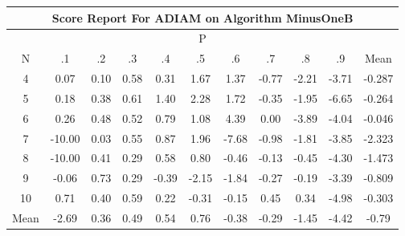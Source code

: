 \documentclass[11pt,a4paper]{report}
\begin{document}
\begin{longtable}{ | c || c | c | c | c | c | c | c | c | c || c |}
\hline
\multicolumn{11}{|c|}{ Score Report For ADIAM on Algorithm MinusOneB} \\
\hline
\multicolumn{11}{|c|}{ P } \\
\hline
N & .1 & .2 & .3 & .4 & .5 & .6 & .7 & .8 & .9 & Mean\\
 \hline
 \hline
 \endhead
  4 &  \cellcolor[HTML]{FFFFFF} 0.07 &  \cellcolor[HTML]{FFFFFF} 0.10 &  \cellcolor[HTML]{EFEFFF} 0.58 &  \cellcolor[HTML]{F7F7FF} 0.31 &  \cellcolor[HTML]{D7D7FF} 1.67 &  \cellcolor[HTML]{DFDFFF} 1.37 &  \cellcolor[HTML]{FFEFEF} -0.77 &  \cellcolor[HTML]{FFC7C7} -2.21 &  \cellcolor[HTML]{FF9F9F} -3.71 & -0.287 \\
  5 &  \cellcolor[HTML]{F7F7FF} 0.18 &  \cellcolor[HTML]{F7F7FF} 0.38 &  \cellcolor[HTML]{EFEFFF} 0.61 &  \cellcolor[HTML]{DFDFFF} 1.40 &  \cellcolor[HTML]{C7C7FF} 2.28 &  \cellcolor[HTML]{D7D7FF} 1.72 &  \cellcolor[HTML]{FFF7F7} -0.35 &  \cellcolor[HTML]{FFCFCF} -1.95 &  \cellcolor[HTML]{FF5858} -6.65 & -0.264 \\
  6 &  \cellcolor[HTML]{F7F7FF} 0.26 &  \cellcolor[HTML]{EFEFFF} 0.48 &  \cellcolor[HTML]{EFEFFF} 0.52 &  \cellcolor[HTML]{EFEFFF} 0.79 &  \cellcolor[HTML]{E7E7FF} 1.08 &  \cellcolor[HTML]{8F8FFF} 4.39 &  \cellcolor[HTML]{FFFFFF} 0.00 &  \cellcolor[HTML]{FF9F9F} -3.89 &  \cellcolor[HTML]{FF9797} -4.04 & -0.046 \\
  7 &  \cellcolor[HTML]{FF0000} -10.00 &  \cellcolor[HTML]{FFFFFF} 0.03 &  \cellcolor[HTML]{EFEFFF} 0.55 &  \cellcolor[HTML]{E7E7FF} 0.87 &  \cellcolor[HTML]{CFCFFF} 1.96 &  \cellcolor[HTML]{FF4040} -7.68 &  \cellcolor[HTML]{FFE7E7} -0.98 &  \cellcolor[HTML]{FFCFCF} -1.81 &  \cellcolor[HTML]{FF9F9F} -3.85 & -2.323 \\
  8 &  \cellcolor[HTML]{FF0000} -10.00 &  \cellcolor[HTML]{F7F7FF} 0.41 &  \cellcolor[HTML]{F7F7FF} 0.29 &  \cellcolor[HTML]{EFEFFF} 0.58 &  \cellcolor[HTML]{E7E7FF} 0.80 &  \cellcolor[HTML]{FFF7F7} -0.46 &  \cellcolor[HTML]{FFFFFF} -0.13 &  \cellcolor[HTML]{FFF7F7} -0.45 &  \cellcolor[HTML]{FF8F8F} -4.30 & -1.473 \\
  9 &  \cellcolor[HTML]{FFFFFF} -0.06 &  \cellcolor[HTML]{EFEFFF} 0.73 &  \cellcolor[HTML]{F7F7FF} 0.29 &  \cellcolor[HTML]{FFF7F7} -0.39 &  \cellcolor[HTML]{FFC7C7} -2.15 &  \cellcolor[HTML]{FFCFCF} -1.84 &  \cellcolor[HTML]{FFF7F7} -0.27 &  \cellcolor[HTML]{FFF7F7} -0.19 &  \cellcolor[HTML]{FFA7A7} -3.39 & -0.809 \\
  10 &  \cellcolor[HTML]{EFEFFF} 0.71 &  \cellcolor[HTML]{F7F7FF} 0.40 &  \cellcolor[HTML]{EFEFFF} 0.59 &  \cellcolor[HTML]{F7F7FF} 0.22 &  \cellcolor[HTML]{FFF7F7} -0.31 &  \cellcolor[HTML]{FFFFFF} -0.15 &  \cellcolor[HTML]{F7F7FF} 0.45 &  \cellcolor[HTML]{F7F7FF} 0.34 &  \cellcolor[HTML]{FF8080} -4.98 & -0.303 \\
 \hline
 \hline
Mean &  \cellcolor[HTML]{FFBFBF} -2.69 &  \cellcolor[HTML]{F7F7FF} 0.36 &  \cellcolor[HTML]{EFEFFF} 0.49 &  \cellcolor[HTML]{EFEFFF} 0.54 &  \cellcolor[HTML]{EFEFFF} 0.76 &  \cellcolor[HTML]{FFF7F7} -0.38 &  \cellcolor[HTML]{FFF7F7} -0.29 &  \cellcolor[HTML]{FFD7D7} -1.45 &  \cellcolor[HTML]{FF8F8F} -4.42 &  \cellcolor[HTML]{FFEFEF} -0.79
\end{longtable}
\end{document}
